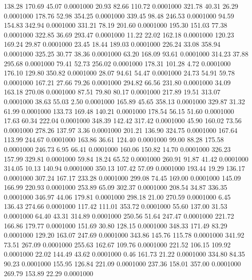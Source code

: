  138.28  170.69   45.07   0.0001000
  20.93   82.66  110.72   0.0001000
 321.78   40.31   26.29   0.0001000
 178.76   52.98  354.25   0.0001000
 339.45   98.48  246.53   0.0001000
  94.59  154.83  342.94   0.0001000
 331.21   78.19  201.60   0.0001000
 195.30  151.03   77.38   0.0001000
 322.85   36.69  293.47   0.0001000
  11.22   22.02  162.18   0.0001000
 120.23  169.24   29.87   0.0001000
  23.45   18.44  189.03   0.0001000
 226.24   33.08  358.94   0.0001000
 325.25   30.77   38.36   0.0001000
  63.20  168.09   93.61   0.0001000
 314.23   37.88  295.68   0.0001000
  79.41   52.73  256.02   0.0001000
 178.31  101.28    4.72   0.0001000
 176.10  129.80  350.82   0.0001000
  28.07   94.61   54.47   0.0001000
  24.73   54.91   59.78   0.0001000
 167.21   27.66   79.26   0.0001000
 294.82   66.56  231.80   0.0001000
  34.09  163.18  270.08   0.0001000
  87.51   79.80   80.17   0.0001000
 217.89   19.51  313.07   0.0001000
  38.63   55.03    2.50   0.0001000
 165.89   45.65  358.13   0.0001000
 329.87   31.32   61.99   0.0001000
 133.73  169.48  140.21   0.0001000
 178.54   56.15   51.60   0.0001000
  17.63   60.34  222.04   0.0001000
 348.39  142.42  317.42   0.0001000
  45.90  160.02   73.56   0.0001000
 278.26  137.97    3.36   0.0001000
 201.21  136.90  324.75   0.0001000
 167.64  113.99  244.67   0.0001000
 163.86   36.61  124.40   0.0001000
  99.00   88.28  175.58   0.0001000
 246.73    6.95   66.41   0.0001000
 160.06  150.82   14.70   0.0001000
 326.23  157.99  329.81   0.0001000
  59.84   18.24   65.52   0.0001000
 260.91   91.87   41.42   0.0001000
 314.05   10.13  140.94   0.0001000
 350.13  107.42   57.09   0.0001000
 193.44   19.29  136.17   0.0001000
 307.24  167.17  233.28   0.0001000
 299.08   74.45  169.00   0.0001000
 145.09  166.99  220.93   0.0001000
 253.89   65.09  302.37   0.0001000
 208.54   34.87  336.35   0.0001000
 346.97   44.06  179.81   0.0001000
 298.18   21.00  270.59   0.0001000
   6.45  136.43  274.66   0.0001000
 117.42  111.01  353.72   0.0001000
  55.60  137.00   31.53   0.0001000
  64.40   43.31  314.89   0.0001000
 250.56   51.64  247.47   0.0001000
 221.72  166.86  179.77   0.0001000
 151.69   30.80  128.15   0.0001000
 348.33  171.49   83.29   0.0001000
 129.20  163.07  247.69   0.0001000
 343.86  145.76  115.78   0.0001000
 341.92   73.51  267.09   0.0001000
 255.63  162.67  109.76   0.0001000
 221.52  106.15  109.92   0.0001000
  22.02  144.49   43.62   0.0001000
   0.46  161.73   21.22   0.0001000
 334.80   84.35   90.23   0.0001000
 155.95  126.84  221.09   0.0001000
 237.36  158.01  357.00   0.0001000
 269.79  153.89   22.29   0.0001000
